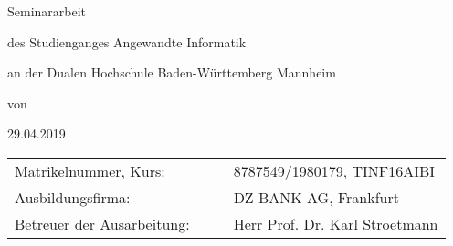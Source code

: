 	\begin{titlepage}
		
		\centering
		{\Large\bfseries \Titel \par}
		\vspace{2cm}
		Seminararbeit \par
		\vspace{3cm}
		
		des Studienganges Angewandte Informatik \par
		an der Dualen Hochschule Baden-Württemberg Mannheim \par
		\vspace{3cm}
		
		von \par
		\vspace{0.5cm}
		{\itshape \Autor \par}
		\vspace{2cm}
		29.04.2019 \par
		
		\vspace{6.5cm}
		\begin{tabular}{llll}
			Matrikelnummer, Kurs: & & & 8787549/1980179, TINF16AIBI\\
			Ausbildungsfirma: & & & DZ BANK AG, Frankfurt\\
			Betreuer der Ausarbeitung: & & & Herr Prof. Dr. Karl Stroetmann
		\end{tabular}
	\end{titlepage}